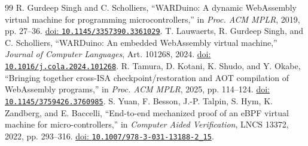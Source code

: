\documentclass[conference,letterpaper]{IEEEtran}
\newcommand{\doi}[1]{\href{https://doi.org/#1}{doi: \nolinkurl{#1}}}
\begin{document}
\begin{thebibliography}{99}
 R. Gurdeep Singh and C. Scholliers, ``WARDuino: A dynamic WebAssembly virtual machine for programming microcontrollers,'' in \emph{Proc. ACM MPLR}, 2019, pp. 27--36. \doi{10.1145/3357390.3361029}.
 T. Lauwaerts, R. Gurdeep Singh, and C. Scholliers, ``WARDuino: An embedded WebAssembly virtual machine,'' \emph{Journal of Computer Languages}, Art. 101268, 2024. \doi{10.1016/j.cola.2024.101268}.
 R. Tamura, D. Kotani, K. Shudo, and Y. Okabe, ``Bringing together cross-ISA checkpoint/restoration and AOT compilation of WebAssembly programs,'' in \emph{Proc. ACM MPLR}, 2025, pp. 114--124. \doi{10.1145/3759426.3760985}.
 S. Yuan, F. Besson, J.-P. Talpin, S. Hym, K. Zandberg, and E. Baccelli, ``End-to-end mechanized proof of an eBPF virtual machine for micro-controllers,'' in \emph{Computer Aided Verification}, LNCS 13372, 2022, pp. 293--316. \doi{10.1007/978-3-031-13188-2_15}.
\end{thebibliography}
\end{document}

